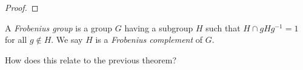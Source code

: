 \documentclass[a4paper]{article}
\begin{document}
\begin{proof}
%
%
\end{proof}

\begin{defi}
  A \emph{Frobenius group} is a group $G$ having a subgroup $H$ such that $H\cap gHg^{-1} = 1$ for all $g \not\in H$. We say $H$ is a \emph{Frobenius complement} of $G$.
\end{defi}
How does this relate to the previous theorem?
\end{document}
